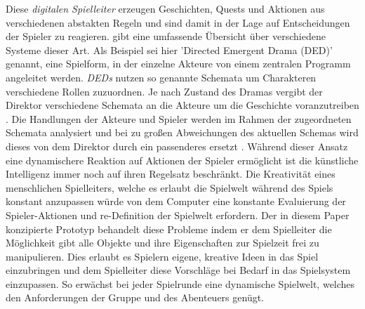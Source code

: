 Diese \emph{digitalen Spielleiter} erzeugen Geschichten, Quests und Aktionen aus verschiedenen abstakten Regeln und sind damit in der Lage auf Entscheidungen der Spieler zu reagieren. \cite{Arinbjarnarb} gibt eine umfassende Übersicht über verschiedene Systeme dieser Art. Als Beispiel sei hier 'Directed Emergent Drama (DED)' \cite{Arinbjarnara} genannt, eine Spielform, in der einzelne Akteure von einem zentralen Programm angeleitet werden. \emph{DEDs} nutzen so genannte Schemata um Charakteren verschiedene Rollen zuzuordnen. Je nach Zustand des Dramas vergibt der Direktor verschiedene Schemata an die Akteure um die Geschichte voranzutreiben \cite{Arinbjarnarb}. Die Handlungen der Akteure und Spieler werden im Rahmen der zugeordneten Schemata analysiert und bei zu großen Abweichungen des aktuellen Schemas wird dieses von dem Direktor durch ein passenderes ersetzt \cite{Arinbjarnar}.\newline
Während dieser Ansatz eine dynamischere Reaktion auf Aktionen der Spieler ermöglicht ist die künstliche Intelligenz immer noch auf ihren Regelsatz beschränkt. Die Kreativität eines menschlichen Spielleiters, welche es erlaubt die Spielwelt während des Spiels konstant anzupassen würde von dem Computer eine konstante Evaluierung der Spieler-Aktionen und re-Definition der Spielwelt erfordern.\newline
Der in diesem Paper konzipierte Prototyp behandelt diese Probleme indem er dem Spielleiter die Möglichkeit gibt alle Objekte und ihre Eigenschaften zur Spielzeit frei zu manipulieren. Dies erlaubt es Spielern eigene, kreative Ideen in das Spiel einzubringen und dem Spielleiter diese Vorschläge bei Bedarf in das Spielsystem einzupassen. So erwächst bei jeder Spielrunde eine dynamische Spielwelt, welches den Anforderungen der Gruppe und des Abenteuers genügt.
